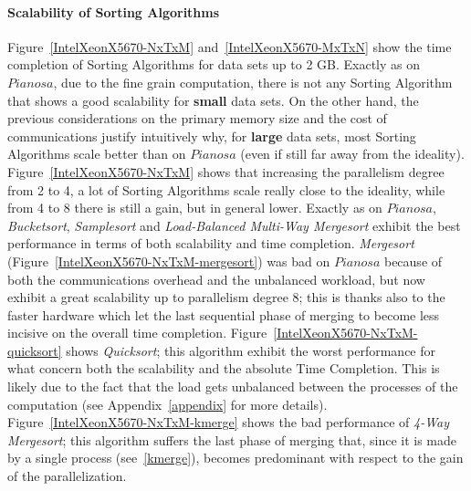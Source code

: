 \paragraph{Scalability of Sorting Algorithms} Figure~\ref{IntelXeonX5670-NxTxM} and~\ref{IntelXeonX5670-MxTxN} show the time completion of Sorting Algorithms for data sets up to 2 GB. Exactly as on $Pianosa$, due to the fine grain computation, there is not any Sorting Algorithm that shows a good scalability for \textbf{small} data sets. On the other hand, the previous considerations on the primary memory size and the cost of communications justify intuitively why, for \textbf{large} data sets, most Sorting Algorithms scale better than on $Pianosa$ (even if still far away from the ideality). Figure~\ref{IntelXeonX5670-NxTxM} shows that increasing the parallelism degree from 2 to 4, a lot of Sorting Algorithms scale really close to the ideality, while from 4 to 8 there is still a gain, but in general lower. Exactly as on $Pianosa$, \textit{Bucketsort}, \textit{Samplesort} and \textit{Load-Balanced Multi-Way Mergesort} exhibit the best performance in terms of both scalability and time completion. \textit{Mergesort} (Figure~\ref{IntelXeonX5670-NxTxM-mergesort}) was bad on $Pianosa$ because of both the communications overhead and the unbalanced workload, but now exhibit a great scalability up to parallelism degree 8; this is thanks also to the faster hardware which let the last sequential phase of merging to become less incisive on the overall time completion. Figure~\ref{IntelXeonX5670-NxTxM-quicksort} shows \textit{Quicksort}; this algorithm exhibit the worst performance for what concern both the scalability and the absolute Time Completion. This is likely due to the fact that the load gets unbalanced between the processes of the computation (see Appendix~\ref{appendix} for more details). Figure~\ref{IntelXeonX5670-NxTxM-kmerge} shows the bad performance of \textit{4-Way Mergesort}; this algorithm suffers the last phase of merging that, since it is made by a single process (see~\ref{kmerge}), becomes predominant with respect to the gain of the parallelization. 

